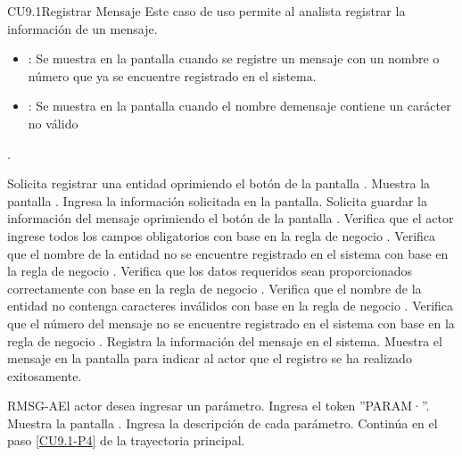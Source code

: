 \begin{UseCase}{CU9.1}{Registrar Mensaje}{
		Este caso de uso permite al analista registrar la información de un mensaje.
	}
{\begin{itemize}
		\item {}: Se muestra en la pantalla  cuando se registre un mensaje con un nombre o número que ya se encuentre registrado en el sistema.
		\item {}: Se muestra en la pantalla  cuando el nombre demensaje contiene un carácter no válido
		\end{itemize}.
		}
	\end{UseCase}
	\begin{UCtrayectoria}
		\UCpaso[\UCactor] Solicita registrar una entidad oprimiendo el botón  de la pantalla .
		\UCpaso[\UCsist] Muestra la pantalla .
		\UCpaso[\UCactor] Ingresa la información solicitada en la pantalla. \label{CU9.1-P3} 
		\UCpaso[\UCactor] Solicita guardar la información del mensaje oprimiendo el botón  de la pantalla . \label{CU9.1-P4}  
		\UCpaso[\UCsist] Verifica que el actor ingrese todos los campos obligatorios con base en la regla de negocio . 
		\UCpaso[\UCsist] Verifica que el nombre de la entidad no se encuentre registrado en el sistema con base en la regla de negocio . 
		\UCpaso[\UCsist] Verifica que los datos requeridos sean proporcionados correctamente con base en la regla de negocio .  
		\UCpaso[\UCsist] Verifica que el nombre de la entidad no contenga caracteres inválidos con base en la regla de negocio . 
		\UCpaso[\UCsist] Verifica que el número del mensaje no se encuentre registrado en el sistema con base en la regla de negocio .  
		\UCpaso[\UCsist] Registra la información del mensaje en el sistema.
		\UCpaso[\UCsist] Muestra el mensaje  en la pantalla  para indicar al actor que el registro se ha realizado exitosamente.
	\end{UCtrayectoria}		
	
	\begin{UCtrayectoriaA}{RMSG-A}{El actor desea ingresar un parámetro.}
		\UCpaso[\UCactor] Ingresa el token ''PARAM·''.
		\UCpaso[\UCsist] Muestra la pantalla .
		\UCpaso[\UCactor] Ingresa la descripción de cada parámetro.
		\UCpaso[\UCsist] Continúa en el paso \ref{CU9.1-P4} de la trayectoria principal.
	\end{UCtrayectoriaA}


